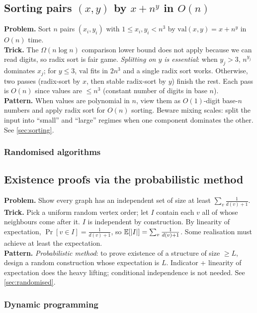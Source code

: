 \subsection{\texorpdfstring{Sorting pairs $(x,y)$ by $x + n^y$ in $O(n)$}{Sorting pairs (x,y) by x+n\^{}y in O(n)}}
\textbf{Problem.} Sort $n$ pairs $(x_i, y_i)$ with $1 \leq x_i, y_i < n^3$ by $\mathrm{val}(x,y) = x + n^y$ in $O(n)$ time.\\
\textbf{Trick.} The $\Omega(n\log n)$ comparison lower bound does not apply because we can read digits, so radix sort is fair game. \emph{Splitting on $y$ is essential}: when $y_j > 3$, $n^{y_j}$ dominates $x_j$; for $y \leq 3$, $\mathrm{val}$ fits in $2n^3$ and a single radix sort works. Otherwise, two passes (radix-sort by $x$, then stable radix-sort by $y$) finish the rest. Each pass is $O(n)$ since values are $\le n^3$ (constant number of digits in base $n$).\\
\textbf{Pattern.} When values are polynomial in $n$, view them as $O(1)$-digit base-$n$ numbers and apply radix sort for $O(n)$ sorting. Beware mixing scales: split the input into ``small'' and ``large'' regimes when one component dominates the other. See \cref{sec:sorting}.

\subsubsection*{Randomised algorithms}

\subsection{Existence proofs via the probabilistic method}
\textbf{Problem.} Show every graph has an independent set of size at least $\sum_{v} \frac{1}{d(v)+1}$.\\
\textbf{Trick.} Pick a uniform random vertex order; let $I$ contain each $v$ all of whose neighbours come after it. $I$ is independent by construction. By linearity of expectation, $\Pr[v \in I] = \frac{1}{d(v)+1}$, so $\operatorname{\mathbb{E}}[|I|] = \sum_v \frac{1}{d(v)+1}$. Some realisation must achieve at least the expectation.\\
\textbf{Pattern.} \emph{Probabilistic method}: to prove existence of a structure of size $\geq L$, design a random construction whose expectation is $L$. Indicator + linearity of expectation does the heavy lifting; conditional independence is not needed. See \cref{sec:randomised}.

\subsubsection*{Dynamic programming}

